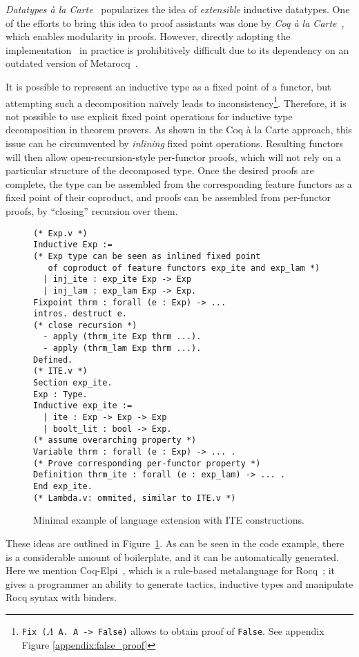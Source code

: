 \documentclass[sigplan,nonacm]{acmart}
\begin{document}
\emph{Datatypes à la Carte}~\cite{swierstra2008data}
popularizes the idea of
\emph{extensible} inductive datatypes. 
One of the efforts to bring this idea to proof assistants
was done by \emph{Coq à la Carte}~\cite{forster2020coq},
which enables modularity in proofs.
However,
directly adopting the implementation~\cite{forster2020coq} in practice
is prohibitively difficult
due to its dependency on an outdated version of Metarocq~\cite{sozeau2020metacoq}.

It is possible to represent an inductive type as a fixed point of a functor,
but attempting such a decomposition na\"ively leads to inconsistency\footnote{\texttt{Fix ($\Lambda$ A. A -> False)} allows to obtain proof of \texttt{False}. See appendix Figure \ref{appendix:false_proof}}. 
Therefore, it is not possible to use explicit fixed point operations for inductive type decomposition in theorem provers.
As shown in the Coq à la Carte approach,
this issue can be circumvented by \emph{inlining} fixed point operations.  
Resulting functors will then allow open-recursion-style per-functor proofs,
which will not rely on a particular structure of the decomposed type.
Once the desired proofs are complete,
the type can be assembled from the corresponding feature functors as a fixed point of their coproduct,
and proofs can be assembled from
per-functor proofs,
by ``closing'' recursion over them.

\begin{figure}
\begin{lstlisting}[language=Coq]
(* Exp.v *)
Inductive Exp := 
(* Exp type can be seen as inlined fixed point 
   of coproduct of feature functors exp_ite and exp_lam *)
  | inj_ite : exp_ite Exp -> Exp
  | inj_lam : exp_lam Exp -> Exp.
Fixpoint thrm : forall (e : Exp) -> ...
intros. destruct e.
(* close recursion *)
  - apply (thrm_ite Exp thrm ...).
  - apply (thrm_lam Exp thrm ...).
Defined.
(* ITE.v *)
Section exp_ite.
Exp : Type.
Inductive exp_ite := 
  | ite : Exp -> Exp -> Exp
  | boolt_lit : bool -> Exp.
(* assume overarching property *)
Variable thrm : forall (e : Exp) -> ... .
(* Prove corresponding per-functor property *)
Definition thrm_ite : forall (e : exp_lam) -> ... .
End exp_ite.
(* Lambda.v: ommited, similar to ITE.v *)
\end{lstlisting}
  \caption{Minimal example of language extension with ITE constructions.}
  \label{fig:alacart_example}
\end{figure}

These ideas are outlined in Figure~\ref{fig:alacart_example}.
As can be seen in the code example,
there is a considerable amount of boilerplate,
and it can be automatically generated.
Here we mention Coq-Elpi~\cite{tassi2025elpi}, which is a rule-based metalanguage for Rocq~\cite{the_coq_development_team_2024_14542673};
it gives a programmer an ability to generate tactics,
inductive types and manipulate Rocq syntax with binders.
\end{document}
